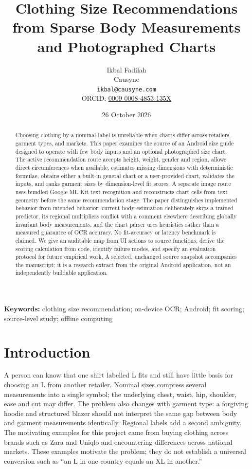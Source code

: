 \documentclass[11pt,a4paper]{article}
\title{Clothing Size Recommendations from Sparse Body Measurements and Photographed Charts}
\author{Ikbal Fadilah\\Causyne\\\texttt{ikbal@causyne.com}\\ORCID: \href{https://orcid.org/0009-0008-4853-135X}{0009-0008-4853-135X}}
\date{26 October 2026}
\begin{document}
\maketitle
\begin{abstract}
Choosing clothing by a nominal label is unreliable when charts differ across retailers, garment types, and markets. This paper examines the source of an Android size guide designed to operate with few body inputs and an optional photographed size chart. The active recommendation route accepts height, weight, gender and region, allows direct circumferences when available, estimates missing dimensions with deterministic formulae, obtains either a built-in general chart or a user-provided chart, validates the inputs, and ranks garment sizes by dimension-level fit scores. A separate image route uses bundled Google ML Kit text recognition and reconstructs chart cells from text geometry before the same recommendation stage. The paper distinguishes implemented behavior from intended behavior: current body estimation deliberately skips a trained predictor, its regional multipliers conflict with a comment elsewhere describing globally invariant body measurements, and the chart parser uses heuristics rather than a measured guarantee of OCR accuracy. No fit-accuracy or latency benchmark is claimed. We give an auditable map from UI actions to source functions, derive the scoring calculation from code, identify failure modes, and specify an evaluation protocol for future empirical work. A selected, unchanged source snapshot accompanies the manuscript; it is a research extract from the original Android application, not an independently buildable application.
\end{abstract}

\noindent\textbf{Keywords:} clothing size recommendation; on-device OCR; Android; fit scoring; source-level study; offline computing

\section{Introduction}
A person can know that one shirt labelled L fits and still have little basis for choosing an L from another retailer. Nominal sizes compress several measurements into a single symbol; the underlying chest, waist, hip, shoulder, ease and cut may differ. The problem also changes with garment type: a forgiving hoodie and structured blazer should not interpret the same gap between body and garment measurements identically. Regional labels add a second ambiguity. The motivating examples for this project came from buying clothing across brands such as Zara and Uniqlo and encountering differences across national markets. These examples motivate the problem; they do not establish a universal conversion such as ``an L in one country equals an XL in another.''
\end{document}
